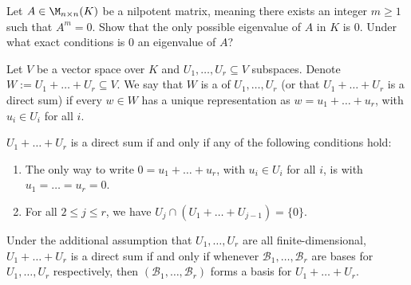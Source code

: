 \begin{exercise}
  \label{exc:nilpotent_matrix_eigenvalues}
  Let $A \in \M_{n \times n}(K)$ be a nilpotent matrix, meaning there exists an integer $m \ge 1$ such that $A^m = 0$. Show that the only possible eigenvalue of $A$ in $K$ is $0$. Under what exact conditions is $0$ an eigenvalue of $A$?
\end{exercise}

\begin{definition}\label{def:direct_sum}
  Let $V$ be a vector space over $K$ and $U_1, \dots, U_r \subseteq V$ subspaces. Denote $W := U_1 + \dots + U_r \subseteq V$. We say that $W$ is a  of $U_1, \dots, U_r$ (or that $U_1 + \dots + U_r$ is a direct sum) if every $w \in W$ has a unique representation as $w = u_1 + \dots + u_r$, with $u_i \in U_i$ for all $i$.
\end{definition}

\begin{exercise}\label{ex:direct_sum_conditions}
  $U_1 + \dots + U_r$ is a direct sum if and only if any of the following conditions hold:
  \begin{enumerate}[label=\textbf{(\alph*)}]
    \item The only way to write $0 = u_1 + \dots + u_r$, with $u_i \in U_i$ for all $i$, is with $u_1 = \dots = u_r = 0$.
    \item For all $2 \le j \le r$, we have $U_j \cap (U_1 + \dots + U_{j-1}) = \{0\}$.
  \end{enumerate}
  Under the additional assumption that $U_1, \dots, U_r$ are all finite-di\-men\-sional, $U_1 + \dots + U_r$ is a direct sum if and only if whenever $\mathcal{B}_1, \dots, \mathcal{B}_r$ are bases for $U_1, \dots, U_r$ respectively, then $(\mathcal{B}_1, \dots, \mathcal{B}_r)$ forms a basis for $U_1 + \dots + U_r$.
\end{exercise}

